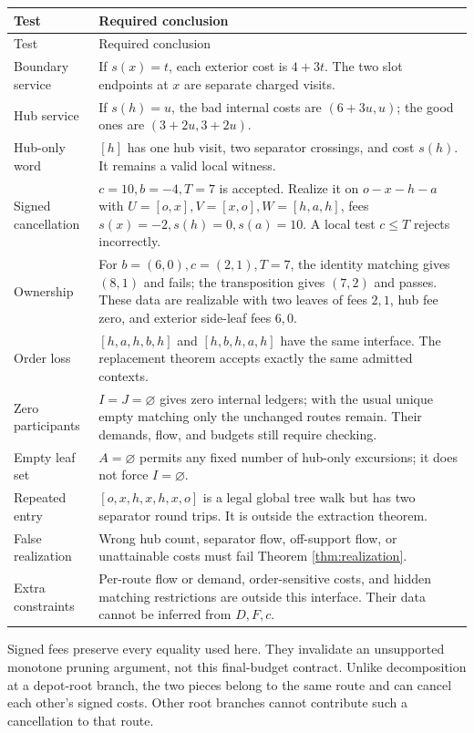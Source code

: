 \documentclass[11pt]{article}
\theoremstyle{remark}
\begin{document}
\begin{longtable}{@{}p{}p{}@{}}
\toprule Test & Required conclusion\\\midrule
\endfirsthead
\toprule Test & Required conclusion\\\midrule
\endhead
Boundary service & If $s(x)=t$, each exterior cost is $4+3t$.
The two slot endpoints at $x$ are separate charged visits.\\[3pt]
Hub service & If $s(h)=u$, the bad internal costs are $(6+3u,u)$;
the good ones are $(3+2u,3+2u)$.\\[3pt]
Hub-only word & $[h]$ has one hub visit, two separator crossings,
and cost $s(h)$. It remains a valid local witness.\\[3pt]
Signed cancellation & $c=10,b=-4,T=7$ is accepted. Realize it on
$o-x-h-a$ with $U=[o,x],V=[x,o],W=[h,a,h]$, fees
$s(x)=-2,s(h)=0,s(a)=10$. A local test $c\le T$ rejects incorrectly.\\[3pt]
Ownership & For $b=(6,0),c=(2,1),T=7$, the identity matching gives
$(8,1)$ and fails; the transposition gives $(7,2)$ and passes.
These data are realizable with two leaves of fees $2,1$, hub fee zero,
and exterior side-leaf fees $6,0$.\\[3pt]
Order loss & $[h,a,h,b,h]$ and $[h,b,h,a,h]$ have the same interface.
The replacement theorem accepts exactly the same admitted contexts.\\[3pt]
Zero participants & $I=J=\varnothing$ gives zero internal ledgers;
with the usual unique empty matching only the unchanged routes remain.
Their demands, flow, and budgets still require checking.\\[3pt]
Empty leaf set & $A=\varnothing$ permits any fixed number of hub-only
excursions; it does not force $I=\varnothing$.\\[3pt]
Repeated entry & $[o,x,h,x,h,x,o]$ is a legal global tree walk but has
two separator round trips. It is outside the extraction theorem.\\[3pt]
False realization & Wrong hub count, separator flow, off-support flow,
or unattainable costs must fail Theorem \ref{thm:realization}.\\[3pt]
Extra constraints & Per-route flow or demand, order-sensitive costs,
and hidden matching restrictions are outside this interface. Their data
cannot be inferred from $D,F,c$.\\
\bottomrule
\end{longtable}

Signed fees preserve every equality used here. They invalidate an unsupported
monotone pruning argument, not this final-budget contract. Unlike decomposition
at a depot-root branch, the two pieces belong to the same route and can cancel
each other's signed costs. Other root branches cannot contribute such a
cancellation to that route.
\end{document}
